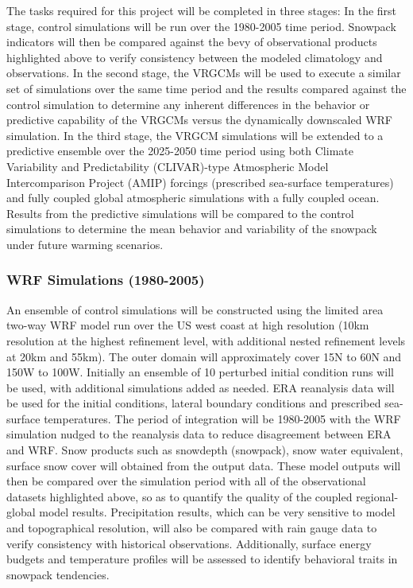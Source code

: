\documentclass[11pt]{article}
\begin{document}
The tasks required for this project will be completed in three stages: In the first stage, control simulations will be run over the 1980-2005 time period. Snowpack indicators will then be compared against the bevy of observational products highlighted above to verify consistency between the modeled climatology and observations. In the second stage, the VRGCMs will be used to execute a similar set of simulations over the same time period and the results compared against the control simulation to determine any inherent differences in the behavior or predictive capability of the VRGCMs versus the dynamically downscaled WRF simulation. In the third stage, the VRGCM simulations will be extended to a predictive ensemble over the 2025-2050 time period using both Climate Variability and Predictability (CLIVAR)-type Atmospheric Model Intercomparison Project (AMIP) forcings (prescribed sea-surface temperatures) and fully coupled global atmospheric simulations with a fully coupled ocean. Results from the predictive simulations will be compared to the control simulations to determine the mean behavior and variability of the snowpack under future warming scenarios.

\subsubsection{WRF Simulations (1980-2005)}
An ensemble of control simulations will be constructed using the limited area two-way WRF model run over the US west coast at high resolution (10km resolution at the highest refinement level, with additional nested refinement levels at 20km and 55km). The outer domain will approximately cover 15N to 60N and 150W to 100W. Initially an ensemble of 10 perturbed initial condition runs will be used, with additional simulations added as needed. ERA reanalysis data will be used for the initial conditions, lateral boundary conditions and prescribed sea-surface temperatures. The period of integration will be 1980-2005 with the WRF simulation nudged to the reanalysis data to reduce disagreement between ERA and WRF. Snow products such as snowdepth (snowpack), snow water equivalent, surface snow cover will obtained from the output data.  These model outputs will then be compared over the simulation period with all of the observational datasets highlighted above, so as to quantify the quality of the coupled regional-global model results. Precipitation results, which can be very sensitive to model and topographical resolution, will also be compared with rain gauge data to verify consistency with historical observations.  Additionally, surface energy budgets and temperature profiles will be assessed to identify behavioral traits in snowpack tendencies.
\end{document}
